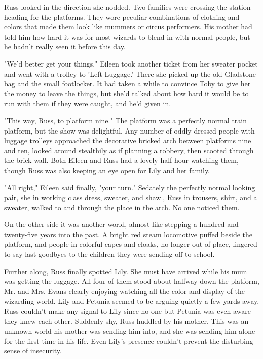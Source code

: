 \documentclass[a4paper,11pt]{article}
\begin{document}
Russ looked in the direction she nodded. Two families were crossing the station heading for the platforms. They wore peculiar combinations of clothing and colors that made them look like mummers or circus performers. His mother had told him how hard it was for most wizards to blend in with normal people, but he hadn't really seen it before this day.

"We'd better get your things." Eileen took another ticket from her sweater pocket and went with a trolley to 'Left Luggage.' There she picked up the old Gladstone bag and the small footlocker. It had taken a while to convince Toby to give her the money to leave the things, but she'd talked about how hard it would be to run with them if they were caught, and he'd given in.

"This way, Russ, to platform nine." The platform was a perfectly normal train platform, but the show was delightful. Any number of oddly dressed people with luggage trolleys approached the decorative bricked arch between platforms nine and ten, looked around stealthily as if planning a robbery, then scooted through the brick wall. Both Eileen and Russ had a lovely half hour watching them, though Russ was also keeping an eye open for Lily and her family.

"All right," Eileen said finally, "your turn." Sedately the perfectly normal looking pair, she in working class dress, sweater, and shawl, Russ in trousers, shirt, and a sweater, walked to and through the place in the arch. No one noticed them.

On the other side it was another world, almost like stepping a hundred and twenty-five years into the past. A bright red steam locomotive puffed beside the platform, and people in colorful capes and cloaks, no longer out of place, lingered to say last goodbyes to the children they were sending off to school.

Further along, Russ finally spotted Lily. She must have arrived while his mum was getting the luggage. All four of them stood about halfway down the platform, Mr. and Mrs. Evans clearly enjoying watching all the color and display of the wizarding world. Lily and Petunia seemed to be arguing quietly a few yards away. Russ couldn't make any signal to Lily since no one but Petunia was even aware they knew each other. Suddenly shy, Russ huddled by his mother. This was an unknown world his mother was sending him into, and she was sending him alone for the first time in his life. Even Lily's presence couldn't prevent the disturbing sense of insecurity.
\end{document}
